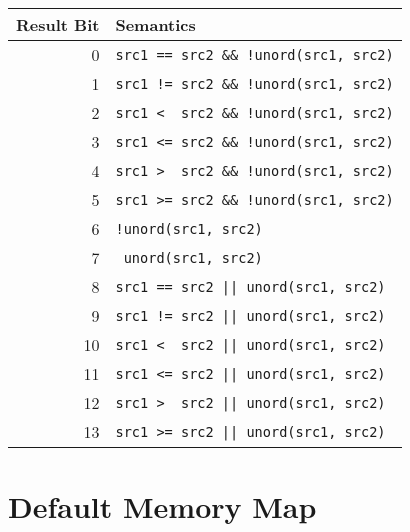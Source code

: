 \documentclass[10pt,DIV12]{scrartcl}
\begin{document}
\begin{tabular}{rl}
\toprule
Result Bit & Semantics \\
\midrule
0 & \texttt{src1 == src2 \&\& !unord(src1, src2)} \\
1 & \texttt{src1 != src2 \&\& !unord(src1, src2)} \\
2 & \texttt{src1 <\ \ src2 \&\& !unord(src1, src2)} \\
3 & \texttt{src1 <= src2 \&\& !unord(src1, src2)} \\
4 & \texttt{src1 >\ \ src2 \&\& !unord(src1, src2)} \\
5 & \texttt{src1 >= src2 \&\& !unord(src1, src2)} \\
6 & \texttt{!unord(src1, src2)} \\
7 & \texttt{\ unord(src1, src2)} \\
8 & \texttt{src1 == src2 || unord(src1, src2)} \\
9 & \texttt{src1 != src2 || unord(src1, src2)} \\
10 & \texttt{src1 <\ \  src2 || unord(src1, src2)} \\
11 & \texttt{src1 <= src2 || unord(src1, src2)} \\
12 & \texttt{src1 >\ \  src2 || unord(src1, src2)} \\
13 & \texttt{src1 >= src2 || unord(src1, src2)} \\
\bottomrule
\end{tabular}

\section{Default Memory Map}
\end{document}
